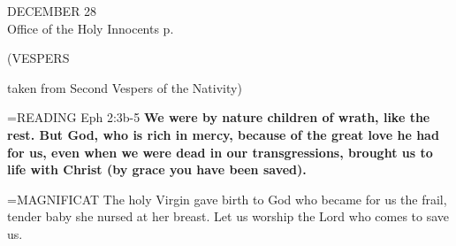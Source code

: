 \begin{center}\normalsize DECEMBER 28\\
\footnotesize Office of the Holy Innocents p. \pageref{propers:holyinnocents}\\
\begin{flushleft}\normalsize \footnotesize (VESPERS\\\end{flushleft} taken from Second Vespers of the Nativity)\\
\end{center}

\hangindent=\parindent \small{READING}    Eph 2:3b-5 \textbf{   We were by nature children of wrath, like the rest. But God, who is rich in mercy, because of the great love he had for us, even when we were dead in our transgressions, brought us to life with Christ (by grace you have been saved).\\}

\hangindent=\parindent \small{MAGNIFICAT      The holy Virgin gave birth to God who became for us the frail, tender baby she nursed at her breast. Let us worship the Lord who comes to save us.\\}

